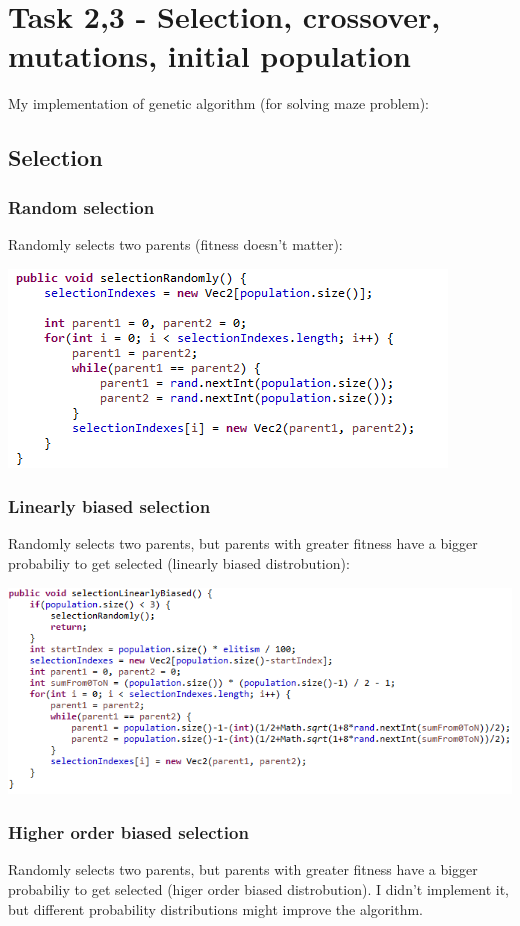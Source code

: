 \documentclass[12pt]{article} %
\begin{document}
\section{Task 2,3 - Selection, crossover, mutations, initial population}
My implementation of genetic algorithm (for solving maze problem):

\subsection{Selection}
\subsubsection{Random selection}
Randomly selects two parents (fitness doesn't matter):

\includegraphics[scale=1]{randomSelection}

\subsubsection{Linearly biased selection}
Randomly selects two parents, but parents with greater fitness have a bigger probabiliy to get selected (linearly biased distrobution):

\includegraphics[scale=1]{linearSelection}


\subsubsection{Higher order biased selection}
Randomly selects two parents, but parents with greater fitness have a bigger probabiliy to get selected (higer order biased distrobution). I didn't implement it, but different probability distributions might improve the algorithm.
\end{document}
